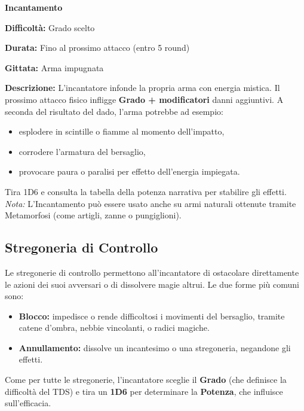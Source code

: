 \documentclass[./magie.tex]{subfiles}
\begin{document}
{\zarafirtitlefont\Large\bfseries\noindent Incantamento}\\
\begin{description}
\item \textbf{Difficoltà:} Grado scelto
\item \textbf{Durata:} Fino al prossimo attacco (entro 5 round)
\item \textbf{Gittata:} Arma impugnata
\item \textbf{Descrizione:} L’incantatore infonde la propria arma con energia mistica. Il prossimo attacco fisico infligge \textbf{Grado + modificatori} danni aggiuntivi. A seconda del risultato del dado, l’arma potrebbe ad esempio:
\begin{itemize}
  \item esplodere in scintille o fiamme al momento dell’impatto,
  \item corrodere l’armatura del bersaglio,
  \item provocare paura o paralisi per effetto dell’energia impiegata.
\end{itemize}
\end{description}

Tira 1D6 e consulta la tabella della potenza narrativa per stabilire gli effetti.\\
\textit{Nota:} L’Incantamento può essere usato anche su armi naturali ottenute tramite Metamorfosi (come artigli, zanne o pungiglioni).

\clearpage
\subsection{Stregoneria di Controllo}

Le stregonerie di controllo permettono all’incantatore di ostacolare direttamente le azioni dei suoi avversari o di dissolvere magie altrui. Le due forme più comuni sono:

\begin{itemize}
\item \textbf{Blocco:} impedisce o rende difficoltosi i movimenti del bersaglio, tramite catene d’ombra, nebbie vincolanti, o radici magiche.
\item \textbf{Annullamento:} dissolve un incantesimo o una stregoneria, negandone gli effetti.
\end{itemize}

Come per tutte le stregonerie, l’incantatore sceglie il \textbf{Grado} (che definisce la difficoltà del TDS) e tira un \textbf{1D6} per determinare la \textbf{Potenza}, che influisce sull’efficacia.
\end{document}
